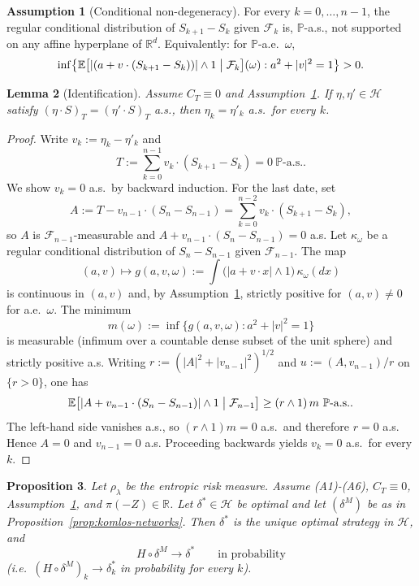 \documentclass[11pt,a4paper]{report}
\numberwithin{equation}{chapter}
\theoremstyle{plain}
\newtheorem{proposition}{Proposition}[chapter]
\newtheorem{lemma}[proposition]{Lemma}
\theoremstyle{definition}
\newtheorem{assumption}[proposition]{Assumption}
\newcommand{\E}{\mathbb{E}}
\newcommand{\PP}{\mathbb{P}}
\newcommand{\R}{\mathbb{R}}
\newcommand{\F}{\mathcal{F}}
\newcommand{\HH}{\mathcal{H}}
\newcommand{\as}{\ \PP\text{-a.s.}}
\begin{document}
\begin{assumption}[Conditional non-degeneracy]\label{ass:nondeg}
    For every $k=0,\dots,n-1$, the regular conditional distribution of $S_{k+1}-S_k$ given $\F_k$ is, $\PP$-a.s., not supported on any affine hyperplane of $\R^d$. Equivalently: for $\PP$-a.e.\ $\omega$,
    \[
        \inf\bigl\{\E\bigl[|(a+v\cdot(S_{k+1}-S_k))|\wedge1\bigm|\F_k\bigr](\omega):a^2+|v|^2=1\bigr\}>0.
    \]
\end{assumption}

\begin{lemma}[Identification]\label{lem:identify}
    Assume $C_T\equiv0$ and Assumption~\ref{ass:nondeg}. If $\eta,\eta'\in\HH$ satisfy $(\eta\cdot S)_T=(\eta'\cdot S)_T$ a.s., then $\eta_k=\eta'_k$ a.s.\ for every $k$.
\end{lemma}

\begin{proof}
    Write $v_k:=\eta_k-\eta'_k$ and
    \[
        T:=\sum_{k=0}^{n-1}v_k\cdot(S_{k+1}-S_k)=0\as.
    \]
    We show $v_k=0$ a.s.\ by backward induction. For the last date, set
    \[
        A:=T-v_{n-1}\cdot(S_n-S_{n-1})=\sum_{k=0}^{n-2}v_k\cdot(S_{k+1}-S_k),
    \]
    so $A$ is $\F_{n-1}$-measurable and $A+v_{n-1}\cdot(S_n-S_{n-1})=0$ a.s. Let $\kappa_\omega$ be a regular conditional distribution of $S_n-S_{n-1}$ given $\F_{n-1}$. The map
    \[
        (a,v)\mapsto g(a,v,\omega):=\int\bigl(|a+v\cdot x|\wedge1\bigr)\,\kappa_\omega(dx)
    \]
    is continuous in $(a,v)$ and, by Assumption~\ref{ass:nondeg}, strictly positive for $(a,v)\ne0$ for a.e.\ $\omega$. The minimum
    \[
        m(\omega):=\inf\bigl\{g(a,v,\omega):a^2+|v|^2=1\bigr\}
    \]
    is measurable (infimum over a countable dense subset of the unit sphere) and strictly positive a.s. Writing $r:=(|A|^2+|v_{n-1}|^2)^{1/2}$ and $u:=(A,v_{n-1})/r$ on $\{r>0\}$, one has
    \[
        \E\bigl[|A+v_{n-1}\cdot(S_n-S_{n-1})|\wedge1\bigm|\F_{n-1}\bigr]\ge(r\wedge1)\,m\as.
    \]
    The left-hand side vanishes a.s., so $(r\wedge1)m=0$ a.s.\ and therefore $r=0$ a.s. Hence $A=0$ and $v_{n-1}=0$ a.s. Proceeding backwards yields $v_k=0$ a.s.\ for every $k$.
\end{proof}

\begin{proposition}\label{prop:strategy-conv}
    Let $\rho_\lambda$ be the entropic risk measure. Assume \textup{(A1)}-\textup{(A6)}, $C_T\equiv0$, Assumption~\ref{ass:nondeg}, and $\pi(-Z)\in\R$. Let $\delta^*\in\HH$ be optimal and let $(\delta^M)$ be as in Proposition~\ref{prop:komlos-networks}. Then $\delta^*$ is the unique optimal strategy in $\HH$, and
    \[
        H\circ\delta^M\longrightarrow\delta^*\qquad\text{in probability}
    \]
    (i.e.\ $(H\circ\delta^M)_k\to\delta^*_k$ in probability for every $k$).
\end{proposition}
\end{document}
